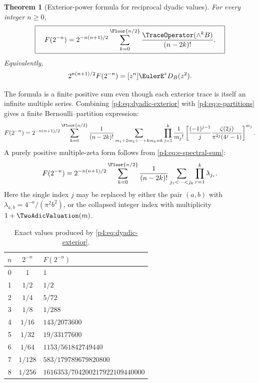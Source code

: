 \documentclass[11pt]{article}
\newtheorem{theorem}{Theorem}[section]
\theoremstyle{definition}
\theoremstyle{remark}
\begin{document}
\begin{theorem}[Exterior-power formula for reciprocal dyadic values]
\label{p4:thm:dyadic-exterior}
For every integer \(n\ge0\),
\begin{equation}
 \boxed{\quad
 F(2^{-n})=2^{-n(n+1)/2}
 \sum_{k=0}^{\Floor{n/2}}
 \frac{\TraceOperator(\wedge^kB)}{(n-2k)!}.
 \quad}
 \label{p4:eq:dyadic-exterior}
\end{equation}
Equivalently,
\begin{equation}
 2^{n(n+1)/2}F(2^{-n})
 =[z^n]\EulerE^zD_B(z^2).
 \label{p4:eq:dyadic-coefficient-det}
\end{equation}
\end{theorem}

The formula is a finite positive sum even though each exterior trace is itself an
infinite multiple series.  Combining \eqref{p4:eq:dyadic-exterior} with
\eqref{p4:eq:e-partitions} gives a finite Bernoulli--partition expression:
\begin{equation}
 F(2^{-n})=2^{-n(n+1)/2}
 \sum_{k=0}^{\Floor{n/2}}\frac1{(n-2k)!}
 \sum_{\substack{m_1+2m_2+\cdots+km_k=k}}
 \prod_{j=1}^{k}
 \frac1{m_j!}
 \left[\frac{(-1)^{j-1}}j
 \frac{\zeta(2j)}{\pi^{2j}(4^j-1)}\right]^{m_j}.
 \label{p4:eq:dyadic-Bernoulli-partition}
\end{equation}
A purely positive multiple-zeta form follows from \eqref{p4:eq:e-spectral-sum}:
\begin{equation}
 F(2^{-n})=2^{-n(n+1)/2}
 \sum_{k=0}^{\Floor{n/2}}\frac1{(n-2k)!}
 \sum_{j_1<\cdots<j_k}\prod_{r=1}^{k}\lambda_{j_r}.
 \label{p4:eq:dyadic-positive-multiple}
\end{equation}
Here the single index \(j\) may be replaced by either the pair \((a,b)\) with
\(\lambda_{a,b}=4^{-a}/(\pi^2b^2)\), or the collapsed integer index with
multiplicity \(1+\TwoAdicValuation(m)\).

\begin{table}[H]
\centering
\caption{Exact values produced by \eqref{p4:eq:dyadic-exterior}.}
\label{p4:tab:dyadic-values}
\begin{tabular}{ccl}
\toprule
\(n\)&\(2^{-n}\)&\(F(2^{-n})\)\\
\midrule
0&1&\(1\)\\
1&\(1/2\)&\(1/2\)\\
2&\(1/4\)&\(5/72\)\\
3&\(1/8\)&\(1/288\)\\
4&\(1/16\)&\(143/2073600\)\\
5&\(1/32\)&\(19/33177600\)\\
6&\(1/64\)&\(1153/561842749440\)\\
7&\(1/128\)&\(583/179789679820800\)\\
8&\(1/256\)&\(1616353/704200217922109440000\)\\
\bottomrule
\end{tabular}
\end{table}
\end{document}
